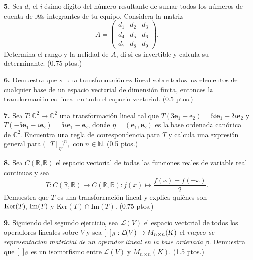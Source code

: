 \documentclass[a4paper]{article}
\begin{document}
\vspace{1cm}
\textbf{5.} Sea $d_i$ el $i$-ésimo dígito del número resultante de sumar todos los números de cuenta de l@s integrantes de tu equipo. Considera la matriz $$A=\begin{pmatrix} d_1 & d_2 & d_3 \\ d_4 & d_5 & d_6 \\ d_7 & d_8 & d_{9} \end{pmatrix}.$$ Determina el rango y la nulidad de $A$, di si es invertible y calcula su determinante. (0.75 ptos.)

\vspace{1cm}
\textbf{6.} Demuestra que si una transformación es lineal sobre todos los elementos de cualquier base de un espacio vectorial de dimensión finita, entonces la transformación es lineal en todo el espacio vectorial. (0.5 ptos.)

\newpage
\textbf{7.} Sea $T:\mathbb{C}^2\to\mathbb{C}^2$ una transformación lineal tal que $T(3\mathbf{e}_1-\mathbf{e}_2)=6i\mathbf{e}_1-2i\mathbf{e}_2$ y $T(-5\mathbf{e}_1-i\mathbf{e}_2)=5i\mathbf{e}_1-\mathbf{e}_2$, donde $\eta=(\mathbf{e}_1,\mathbf{e}_2)$ es la base ordenada canónica de $\mathbb{C}^2$. Encuentra una regla de correspondencia para $T$ y calcula una expresión general para $\big([T]_\eta\big)^n,$ con $n\in\mathbb{N}$. (0.5 ptos.)

\vspace{1cm}
\textbf{8.} Sea $C(\mathbb{R},\mathbb{R})$ el espacio vectorial de todas las funciones reales de variable real continuas y sea $$T:C(\mathbb{R},\mathbb{R})\to C(\mathbb{R},\mathbb{R}) : f(x) \mapsto \frac{f(x)+f(-x)}{2}.$$ \noindent Demuestra que $T$ es una transformación lineal y explica quiénes son $\text{Ker}(T), \hspace{0.5mm} \text{Im}(T)$ y $\text{Ker}(T)\cap\text{Im}(T)$. (0.75 ptos.)

\vspace{1cm}
\textbf{9.} Siguiendo del segundo ejercicio, sea $\mathcal{L}(V)$ el espacio vectorial de todos los operadores lineales sobre $V$ y sea $[\hspace{0.5mm} \cdot\hspace{0.5mm}]_\beta:\mathcal{L}(V) \to M_{n\times n}(K)$ el \emph{mapeo de representación matricial de un operador lineal en la base ordenada} $\beta$. Demuestra que $[\hspace{0.5mm} \cdot \hspace{0.5mm}]_\beta$ es un isomorfismo entre $\mathcal{L}(V)$ y $M_{n\times n}(K)$. (1.5 ptos.)
\end{document}
